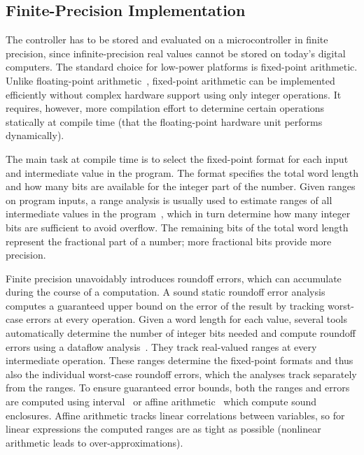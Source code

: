 \subsection{Finite-Precision Implementation}

The controller has to be stored and evaluated on a microcontroller in
finite precision, since infinite-precision real values cannot be stored on
today's digital computers.
The standard choice for low-power platforms is fixed-point arithmetic. Unlike
floating-point arithmetic~\cite{ieee75408}, fixed-point arithmetic can be implemented efficiently
without complex hardware support using only integer operations. It requires,
however, more compilation effort to determine certain operations statically at
compile time (that the floating-point hardware unit performs dynamically).
 
The main task at compile time is to select the fixed-point format for each input and intermediate value
in the program. The format specifies the total word length and how many bits are
available for the integer part of the number. Given ranges on program inputs, a
range analysis is usually used to estimate ranges of all intermediate values in the
program~\cite{Pang2011,Kinsman2009}, which in turn determine how many integer bits are sufficient to
avoid overflow. The remaining bits of the total word length represent the
fractional part of a number; more fractional bits provide more precision. 

Finite precision unavoidably introduces roundoff errors, which can accumulate
during the course of a computation.
A sound static roundoff error analysis computes a guaranteed upper bound on the
error of the result by tracking worst-case errors at every operation. Given a
word length for each value, several tools automatically determine the number of
integer bits needed and compute roundoff errors using a dataflow analysis~\cite{Daisy,Gappa}.
They track real-valued ranges at every intermediate operation. These ranges
determine the fixed-point formats and thus also the individual worst-case roundoff errors,
which the analyses track separately from the ranges. To ensure guaranteed
error bounds, both the ranges and errors are computed using interval~\cite{intervals} or
affine arithmetic~\cite{affineArithmetic} which compute sound enclosures. 
Affine arithmetic tracks linear correlations between variables, so for linear expressions
the computed ranges are as tight as possible (nonlinear arithmetic
leads to over-approximations).

